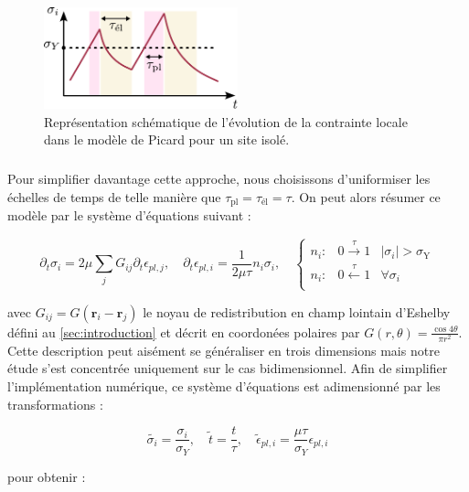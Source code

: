 \begin{figure}[h]
	\centering
	\includegraphics[width=0.5\textwidth]{Chapitre4/Figures/Methode/PicardTau.pdf}
	\caption{Représentation schématique de l'évolution de la contrainte locale dans le modèle de Picard pour un site isolé.}
	\label{fig:rules}
\end{figure}

\subparagraph{}Pour simplifier davantage cette approche, nous choisissons d'uniformiser les échelles de temps de telle manière que $\tau_{\text{pl}} = \tau_{\text{él}} = \tau$. On peut alors résumer ce modèle par le système d'équations suivant :

\begin{equation}
	\partial_t\sigma_i = 2\mu\sum_{j}G_{ij}\partial_t \epsilon_{pl,j},\quad \partial_t \epsilon_{pl,i} = \frac{1}{2\mu\tau}n_i \sigma_i,\quad
	\left\{
    \begin{array}{lcc}
    n_i: & 0\xrightarrow{\tau}1 & |\sigma_i|>\sigma_\mathrm{Y} \\
    n_i: & 0\xleftarrow{\tau}1 & \forall \sigma_i\\
    \end{array}
    \right.
\label{eq:PicardRules}
\end{equation}

\noindent avec $G_{ij} = G(\mathbf{r}_i-\mathbf{r}_j)$ le noyau de redistribution en champ lointain d'Eshelby  défini au \autoref{sec:introduction} et décrit en coordonées polaires par $G(r,\theta) = \frac{\cos 4\theta}{\pi r^2}$. Cette description peut aisément se généraliser en trois dimensions mais notre étude s'est concentrée uniquement sur le cas bidimensionnel. Afin de simplifier l'implémentation numérique, ce système d'équations est adimensionné par les transformations :

\begin{equation}
	\tilde{\sigma_i} = \frac{\sigma_i}{\sigma_Y},\quad \tilde{t} = \frac{t}{\tau}, \quad \tilde{\epsilon}_{pl,i} = \frac{\mu\tau}{\sigma_Y}\epsilon_{pl,i}
	\label{eq:PicardDim}
\end{equation}

\noindent pour obtenir :


